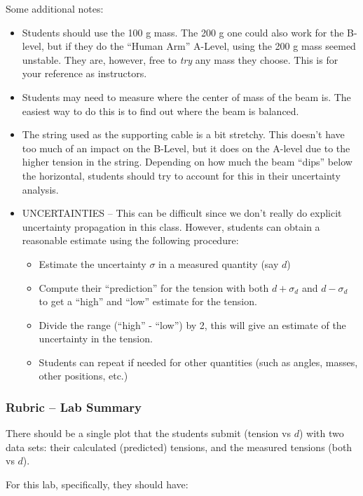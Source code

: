 \documentclass[fleqn,letterpaper]{article}
\begin{document}
Some additional notes:

\begin{itemize}
\item{Students should use the 100 g mass.  The 200 g one could also work for the B-level, but if they do the ``Human Arm'' A-Level, using the 200 g mass seemed unstable.  They are, however, free to \textit{try} any mass they choose.  This is for your reference as instructors.}
\item{Students may need to measure where the center of mass of the beam is.  The easiest way to do this is to find out where the beam is balanced.}
\item{The string used as the supporting cable is a bit stretchy.  This doesn't have too much of an impact on the B-Level, but it does on the A-level due to the higher tension in the string.  Depending on how much the beam ``dips'' below the horizontal, students should try to account for this in their uncertainty analysis.}
\item{UNCERTAINTIES -- This can be difficult since we don't really do explicit uncertainty propagation in this class.  However, students can obtain a reasonable estimate using the following procedure:
  \begin{itemize}
  \item{Estimate the uncertainty $\sigma$ in a measured quantity (say $d$)}
  \item{Compute their ``prediction'' for the tension with both $d + \sigma_d$ and $d - \sigma_d$ to get a ``high'' and ``low'' estimate for the tension.}
  \item{Divide the range (``high'' - ``low'') by 2, this will give an estimate of the uncertainty in the tension.}
  \item{Students can repeat if needed for other quantities (such as angles, masses, other positions, etc.)}
  \end{itemize}}
\end{itemize}

\subsubsection*{Rubric -- Lab Summary}

There should be a single plot that the students submit (tension vs $d$) with two data sets: their calculated (predicted) tensions, and the measured tensions (both vs $d$).

For this lab, specifically, they should have:
\end{document}
